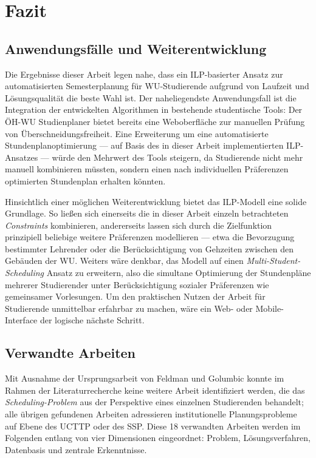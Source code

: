 \section{Fazit}\label{chap:fazit}


\subsection{Anwendungsfälle und Weiterentwicklung}

Die Ergebnisse dieser Arbeit legen nahe, dass ein ILP-basierter Ansatz zur automatisierten Semesterplanung für WU-Studierende aufgrund von Laufzeit und Lösungsqualität die beste Wahl ist. Der naheliegendste Anwendungsfall ist die Integration der entwickelten Algorithmen in bestehende studentische Tools: Der ÖH-WU Studienplaner \cite{studienplaner-oeh} bietet bereits eine Weboberfläche zur manuellen Prüfung von Überschneidungsfreiheit. Eine Erweiterung um eine automatisierte Stundenplanoptimierung --- auf Basis des in dieser Arbeit implementierten ILP-Ansatzes --- würde den Mehrwert des Tools steigern, da Studierende nicht mehr manuell kombinieren müssten, sondern einen nach individuellen Präferenzen optimierten Stundenplan erhalten könnten.

Hinsichtlich einer möglichen Weiterentwicklung bietet das ILP-Modell eine solide Grundlage. So ließen sich einerseits die in dieser Arbeit einzeln betrachteten \textit{Constraints} kombinieren, andererseits lassen sich durch die Zielfunktion prinzipiell beliebige weitere Präferenzen modellieren --- etwa die Bevorzugung bestimmter Lehrender oder die Berücksichtigung von Gehzeiten zwischen den Gebäuden der WU. Weiters wäre denkbar, das Modell auf einen \textit{Multi-Student-Scheduling} Ansatz zu erweitern, also die simultane Optimierung der Stundenpläne mehrerer Studierender unter Berücksichtigung sozialer Präferenzen wie gemeinsamer Vorlesungen. Um den praktischen Nutzen der Arbeit für Studierende unmittelbar erfahrbar zu machen, wäre ein Web- oder Mobile-Interface der logische nächste Schritt.


\subsection{Verwandte Arbeiten}

Mit Ausnahme der Ursprungsarbeit von Feldman und Golumbic \cite{feldmangolumbic} konnte im Rahmen der Literaturrecherche keine weitere Arbeit identifiziert werden, die das \textit{Scheduling-Problem} aus der Perspektive eines einzelnen Studierenden behandelt; alle übrigen gefundenen Arbeiten adressieren institutionelle Planungsprobleme auf Ebene des UCTTP oder des SSP. Diese 18 verwandten Arbeiten werden im Folgenden entlang von vier Dimensionen eingeordnet: Problem, Lösungsverfahren, Datenbasis und zentrale Erkenntnisse.

